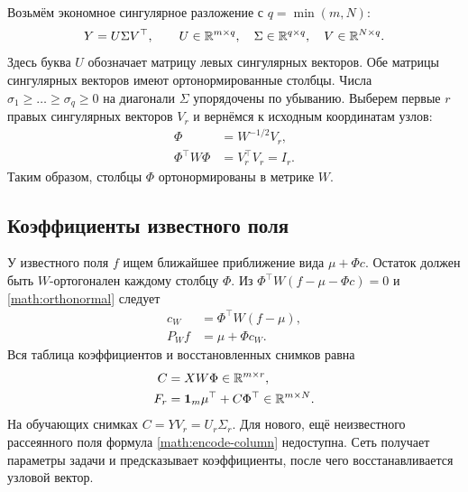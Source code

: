 Возьмём экономное сингулярное разложение с $q=\min(m,N)$:
\begin{equation}
 Y=U\Sigma V^\top,\qquad
 U\in\mathbb{R}^{m\times q},\quad\Sigma\in\mathbb{R}^{q\times q},\quad
 V\in\mathbb{R}^{N\times q}.\label{math:svd}
\end{equation}
Здесь буква $U$ обозначает матрицу левых сингулярных векторов. Обе
матрицы сингулярных векторов имеют ортонормированные столбцы.
Числа $\sigma_1\ge\ldots\ge\sigma_q\ge0$ на диагонали $\Sigma$
упорядочены по убыванию. Выберем первые $r$ правых сингулярных векторов
$V_r$ и вернёмся к исходным координатам узлов:
\begin{align}
 \Phi&=W^{-1/2}V_r,\label{math:modes}\\
 \Phi^\top W\Phi&=V_r^\top V_r=I_r.\label{math:orthonormal}
\end{align}
Таким образом, столбцы $\Phi$ ортонормированы в метрике $W$.

\subsection{Коэффициенты известного поля}
У известного поля $f$ ищем ближайшее приближение вида $\mu+\Phi c$.
Остаток должен быть $W$-ортогонален каждому столбцу $\Phi$. Из
$\Phi^\top W(f-\mu-\Phi c)=0$ и \eqref{math:orthonormal} следует
\begin{align}
 c_W&=\Phi^\top W(f-\mu),\label{math:encode-column}\\
 P_W f&=\mu+\Phi c_W.\label{math:decode-column}
\end{align}
Вся таблица коэффициентов и восстановленных снимков равна
\begin{align}
 C&=XW\Phi\in\mathbb{R}^{m\times r},\label{math:encode-row}\\
 F_r&=\bm1_m\mu^\top+C\Phi^\top\in\mathbb{R}^{m\times N}.\label{math:decode-row}
\end{align}
На обучающих снимках $C=YV_r=U_r\Sigma_r$. Для нового, ещё неизвестного
рассеянного поля формула \eqref{math:encode-column} недоступна.
Сеть получает параметры задачи и предсказывает коэффициенты, после чего
восстанавливается узловой вектор.

